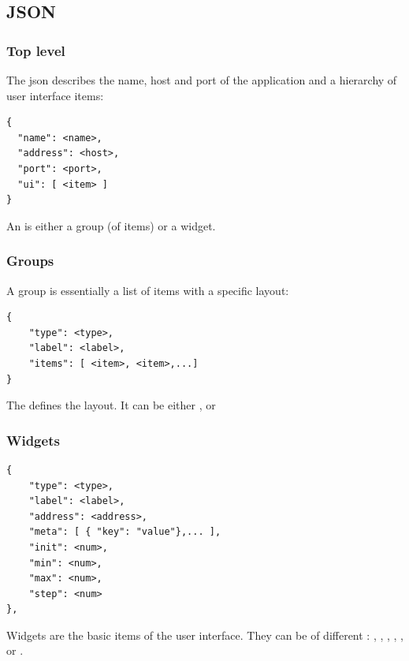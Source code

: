 \subsection*{JSON}
\subsubsection*{Top level}
The json describes the name, host and port of the application and a hierarchy of user interface items:
\begin{lstlisting}
{
  "name": <name>,
  "address": <host>,
  "port": <port>,
  "ui": [ <item> ]
}
\end{lstlisting}
An  is either a group (of items) or a widget.

\subsubsection*{Groups}
A group is essentially a list of items with a specific layout: 
\begin{lstlisting}
{
	"type": <type>,
	"label": <label>,
	"items": [ <item>, <item>,...]
}
\end{lstlisting}
The  defines the layout. It can be either ,  or 

\subsubsection*{Widgets}
\begin{lstlisting}
{
	"type": <type>,
	"label": <label>,
	"address": <address>,
	"meta": [ { "key": "value"},... ],
	"init": <num>,
	"min": <num>,
	"max": <num>,
	"step": <num>
},
\end{lstlisting}
Widgets are the basic items of the user interface. They can be of different  : ,  , , , ,  or .



